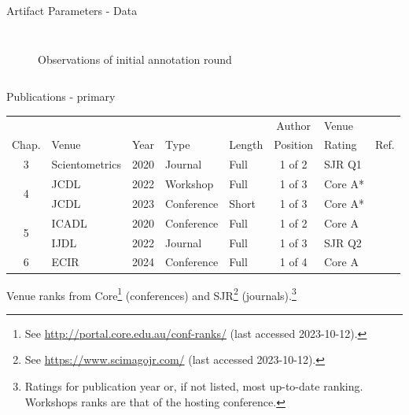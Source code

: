 \documentclass[en,16:9,smallfoot]{sdqbeamer}
\begin{document}
\begin{frame}{Artifact Parameters - Data}
\begin{columns}
\begin{figure}
{                }
                \caption{Observations of initial annotation round}
                \label{fig:init-annot}
            \end{figure}
   \end{columns}
   \end{frame}


   \begin{frame}{Publications - primary}
    \begin{table}
    \centering
      \begin{tabular}{cllllclr}
        \hline
        \ & \ & \ & \ & \ & Author & Venue & \ \\
        Chap. & Venue & Year & Type & Length & Position & Rating & Ref. \\
        \hline
        3 & Scientometrics & 2020 & Journal & Full & 1 of 2 & SJR Q1 & \cite{Saier2020} \\
        \cline{1-1}
        \multirow{2}{*}{4} & JCDL & 2022 & Workshop & Full & 1 of 3 & Core A* & \cite{Saier2022ULITE} \\
        \ & JCDL & 2023 & Conference & Short & 1 of 3 & Core A* & \cite{Saier2023unarXive} \\
        \cline{1-1}
        \multirow{2}{*}{5} & ICADL & 2020 & Conference & Full & 1 of 2 & Core A & \cite{Saier2020xling} \\
        \ & IJDL & 2022 & Journal & Full & 1 of 3 & SJR Q2 & \cite{Saier2021} \\
        \cline{1-1}
        6 & ECIR & 2024 & Conference & Full & 1 of 4 & Core A & \cite{Saier2024HyperPIE} \\
        \hline
        \end{tabular}
    \end{table}

    Venue ranks from Core\footnote{See \url{http://portal.core.edu.au/conf-ranks/} (last accessed 2023-10-12).} (conferences) and SJR\footnote{See \url{https://www.scimagojr.com/} (last accessed 2023-10-12).} (journals).\footnote{Ratings for publication year or, if not listed, most up-to-date ranking. Workshops ranks are that of the hosting conference.}

   \end{frame}
\end{document}
